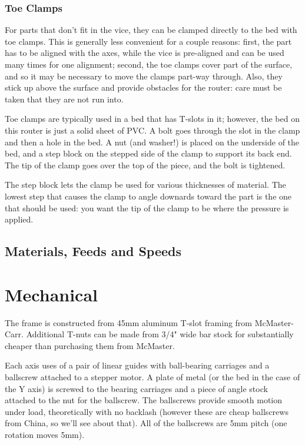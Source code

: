 \documentclass[a4paper,11pt]{article}
\begin{document}
\subsubsection{Toe Clamps}
For parts that don't fit in the vice, they can be clamped directly to the bed with toe clamps. This is generally less convenient for a couple reasons: first, the part has to be aligned with the axes, while the vice is pre-aligned and can be used many times for one alignment; second, the toe clamps cover part of the surface, and so it may be necessary to move the clamps part-way through. Also, they stick up above the surface and provide obstacles for the router: care must be taken that they are not run into. 

Toe clamps are typically used in a bed that has T-slots in it; however, the bed on this router is just a solid sheet of PVC. A bolt goes through the slot in the clamp and then a hole in the bed. A nut (and washer!) is placed on the underside of the bed, and a step block on the stepped side of the clamp to support its back end. The tip of the clamp goes over the top of the piece, and the bolt is tightened.


The step block lets the clamp be used for various thicknesses of material. The lowest step that causes the clamp to angle downards toward the part is the one that should be used: you want the tip of the clamp to be where the pressure is applied.


\subsection{Materials, Feeds and Speeds}



\section{Mechanical}
The frame is constructed from 45mm aluminum T-slot framing from McMaster-Carr. Additional T-nuts can be made from 3/4" wide bar stock for substantially cheaper than purchasing them from McMaster. 

Each axis uses of a pair of linear guides with ball-bearing carriages and a ballscrew attached to a stepper motor. A plate of metal (or the bed in the case of the Y axis) is screwed to the bearing carriages and a piece of angle stock attached to the nut for the ballscrew. The ballscrews provide smooth motion under load, theoretically with no backlash (however these are cheap ballscrews from China, so we'll see about that). All of the ballscrews are 5mm pitch (one rotation moves 5mm). 
\end{document}
